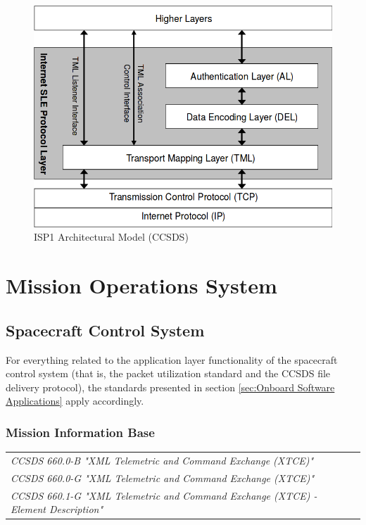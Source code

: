 \begin{figure}[h]
\centering\includegraphics[scale=0.4]{fig/isp1_architectural_model}
\caption{ISP1 Architectural Model (CCSDS)}
\label{fig:ISP1 Architectural Model}
\end{figure}

\section{Mission Operations System}

\subsection{Spacecraft Control System}

For everything related to the application layer functionality of the spacecraft control system (that is, the packet utilization standard and the CCSDS file delivery protocol), the standards presented in section \ref{sec:Onboard Software Applications} apply accordingly.

\subsubsection{Mission Information Base}

\begin{tabular}{l}
\textit{CCSDS 660.0-B "XML Telemetric and Command Exchange (XTCE)" \cite{CCSDS-660.0-B}} \\
\textit{CCSDS 660.0-G "XML Telemetric and Command Exchange (XTCE)" \cite{CCSDS-660.0-G}} \\
\textit{CCSDS 660.1-G "XML Telemetric and Command Exchange (XTCE) - Element Description" \cite{CCSDS-660.1-G}} \\
\end{tabular}

